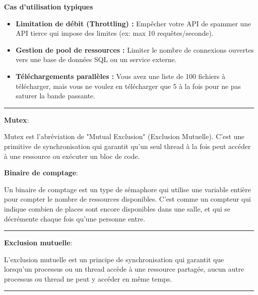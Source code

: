 \noindent \textbf{Cas d'utilisation typiques}

\begin{itemize}
    \item \textbf{Limitation de débit (Throttling) :} Empêcher votre API de spammer une API tierce qui impose des limites (ex: max 10 requêtes/seconde).
    \item \textbf{Gestion de pool de ressources :} Limiter le nombre de connexions ouvertes vers une base de données SQL ou un service externe.
    \item \textbf{Téléchargements parallèles :} Vous avez une liste de 100 fichiers à télécharger, mais vous ne voulez en télécharger que 5 à la fois pour ne pas saturer la bande passante.
\end{itemize}

\begin{center}
\rule{5cm}{0.4pt}
\end{center}

\vspace{0.5cm}

\noindent \textbf{Mutex}:

\noindent Mutex est l'abréviation de "Mutual Exclusion" (Exclusion Mutuelle). C'est une primitive de synchronisation qui garantit qu'un seul thread à la fois peut accéder à une ressource ou exécuter un bloc de code.

\newpage

\noindent \textbf{Binaire de comptage}:

\noindent Un binaire de comptage est un type de sémaphore qui utilise une variable entière pour compter le nombre de ressources disponibles. C'est comme un compteur qui indique combien de places sont encore disponibles dans une salle, et qui se décrémente chaque fois qu'une personne entre.

\begin{center}
\rule{5cm}{0.4pt}
\end{center}

\vspace{0.5cm}

\noindent \textbf{Exclusion mutuelle}:

\noindent L'exclusion mutuelle est un principe de synchronisation qui garantit que lorsqu'un processus ou un thread accède à une ressource partagée, aucun autre processus ou thread ne peut y accéder en même temps.

\begin{center}
\rule{5cm}{0.4pt}
\end{center}

